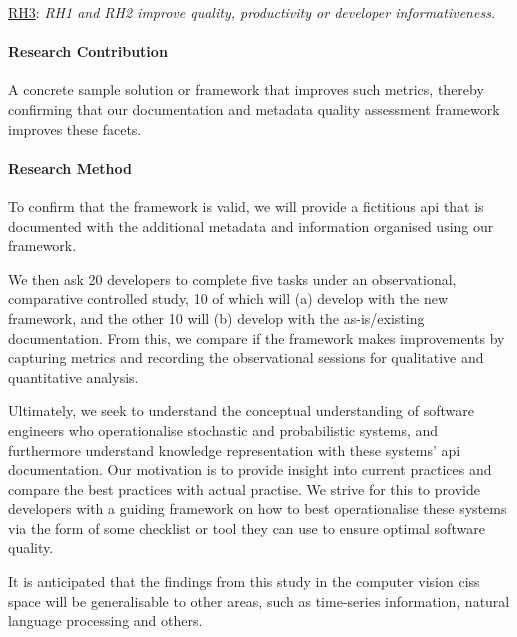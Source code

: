 \begin{titled-frame}{\underline{RH3}: \textit{RH1 and RH2 improve quality,  productivity or developer informativeness.} }
\paragraph{Research Contribution}
A concrete sample solution or framework that improves such metrics, thereby confirming that our documentation and metadata quality assessment framework improves these facets.

\paragraph{Research Method}

To confirm that the framework is valid, we will provide a fictitious \gls{api} that is documented with the additional metadata and information organised using our framework.

We then ask 20 developers to complete five tasks under an observational, comparative controlled study, 10 of which will (a) develop with the new framework, and the other 10 will (b) develop with the as-is/existing documentation. From this, we compare if the framework makes improvements by capturing metrics and recording the observational sessions for qualitative and quantitative analysis.
\end{titled-frame}

Ultimately, we seek to understand the conceptual understanding of software engineers who operationalise stochastic and probabilistic systems, and furthermore understand knowledge representation with these systems' \gls{api} documentation. Our motivation is to provide insight into current practices and compare the best practices with actual practise. We strive for this to  provide developers with a guiding framework on how to best operationalise these systems via the form of some checklist or tool they can use to ensure optimal software quality.

It is anticipated that the findings from this study in the computer vision \glspl{cis} space will be generalisable to other areas, such as time-series information, natural language processing and others.

